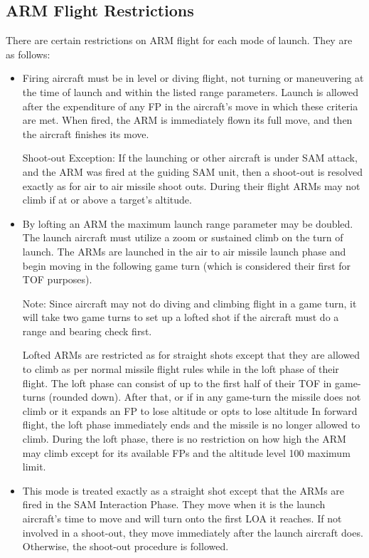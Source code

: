 \subsection{ARM Flight Restrictions} There are certain restrictions on ARM flight for each mode of launch. They are as follows:

\begin{itemize}

\item{} Firing aircraft must be in level or diving flight, not turning or maneuvering at the time of launch and within the listed range parameters. Launch is allowed after the expenditure of any FP in the aircraft's move in which these criteria are met. When fired, the ARM is immediately flown its full move, and then the aircraft finishes its move.

Shoot-out Exception: If the launching or other aircraft is under SAM attack, and the ARM was fired at the guiding SAM unit, then a shoot-out is resolved exactly as for air to air missile shoot outs. During their flight ARMs may not climb if at or above a target's altitude.

\item{} By lofting an ARM the maximum launch range parameter may be doubled. The launch aircraft must utilize a zoom or sustained climb on the turn of launch. The ARMs are launched in the air to air missile launch phase and begin moving in the following game turn (which is considered their first for TOF purposes).

Note: Since aircraft may not do diving and climbing flight in a game turn, it will take two game turns to set up a lofted shot if the aircraft must do a range and bearing check first.

Lofted ARMs are restricted as for straight shots except that they are allowed to climb as per normal missile flight rules while in the loft phase of their flight. The loft phase can consist of up to the first half of their TOF in game-turns (rounded down). After that, or if in any game-turn the missile does not climb or it expands an FP to lose altitude or opts to lose altitude In forward flight, the loft phase immediately ends and the missile is no longer allowed to climb. During the loft phase, there is no restriction on how high the ARM may climb except for its available FPs and the altitude level 100 maximum limit.

\item{} This mode is treated exactly as a straight shot except that the ARMs are fired in the SAM Interaction Phase. They move when it is the launch aircraft's time to move and will turn onto the first LOA it reaches. If not involved in a shoot-out, they move immediately after the launch aircraft does. Otherwise, the shoot-out procedure is followed.

\end{itemize}

